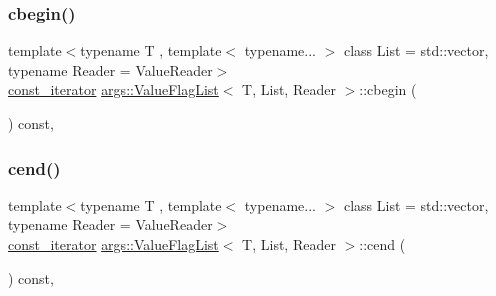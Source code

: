 \mbox{\label{classargs_1_1_value_flag_list_aac43394cc9d6d720ea34406985b2ca31}} 
\subsubsection{\texorpdfstring{cbegin()}{cbegin()}}
{\footnotesize\ttfamily template$<$typename T , template$<$ typename... $>$ class List = std\+::vector, typename Reader  = Value\+Reader$>$ \\
\hyperlink{classargs_1_1_value_flag_list_afc267bd3d85ff266eccf4b66cea4a274}{const\+\_\+iterator} \hyperlink{classargs_1_1_value_flag_list}{args\+::\+Value\+Flag\+List}$<$ T, List, Reader $>$\+::cbegin (\begin{DoxyParamCaption}{ }\end{DoxyParamCaption}) const\hspace{0.3cm}{\ttfamily [inline]}, {\ttfamily [noexcept]}}

\mbox{\label{classargs_1_1_value_flag_list_aaa2f211b8519092dfc4c90a4a664b540}} 
\subsubsection{\texorpdfstring{cend()}{cend()}}
{\footnotesize\ttfamily template$<$typename T , template$<$ typename... $>$ class List = std\+::vector, typename Reader  = Value\+Reader$>$ \\
\hyperlink{classargs_1_1_value_flag_list_afc267bd3d85ff266eccf4b66cea4a274}{const\+\_\+iterator} \hyperlink{classargs_1_1_value_flag_list}{args\+::\+Value\+Flag\+List}$<$ T, List, Reader $>$\+::cend (\begin{DoxyParamCaption}{ }\end{DoxyParamCaption}) const\hspace{0.3cm}{\ttfamily [inline]}, {\ttfamily [noexcept]}}

\mbox{\label{classargs_1_1_value_flag_list_a85588944b3b2240d09e21e3df66c6ab0}} 
